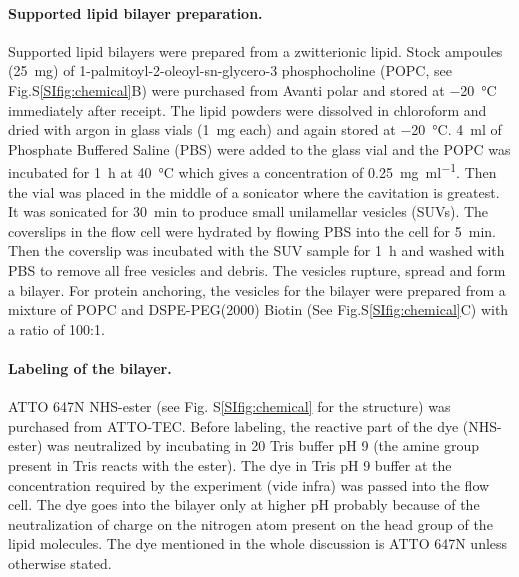 \paragraph*{Supported lipid bilayer preparation.}
Supported lipid bilayers were prepared from a zwitterionic lipid.
Stock ampoules (\SI{25}{\mg}) of 1-palmitoyl-2-oleoyl-sn-glycero-3 phosphocholine (POPC, see Fig.S\ref{SIfig:chemical}B) were purchased from Avanti polar and stored at \SI{-20}{\celsius} immediately after receipt.
The lipid powders were dissolved in chloroform and dried with argon in glass vials (\SI{1}{\mg} each) and again stored at \SI{-20}{\celsius}.
\SI{4}{\ml} of Phosphate Buffered Saline (PBS) were added to the glass vial and the POPC was incubated for \SI{1}{\hour} at \SI{40}{\celsius} which gives a concentration of \SI[per-mode=symbol]{0.25}{\mg \per\ml}.
Then the vial was placed in the middle of a sonicator where the cavitation is greatest.
It was sonicated for \SI{30}{\minute} to produce small unilamellar vesicles (SUVs). 
The coverslips in the flow cell were hydrated by flowing PBS into the cell for \SI{5}{\minute}.
Then the coverslip was incubated with the SUV sample for \SI{1}{\hour} and washed with PBS to remove all free vesicles and debris.
The vesicles rupture, spread and form a bilayer.\cite{richter2006formation}
For protein anchoring, the vesicles for the bilayer were prepared from a mixture of POPC and DSPE-PEG(2000) Biotin (See Fig.S\ref{SIfig:chemical}C) with a ratio of 100:1.


\paragraph*{Labeling of the bilayer.}
ATTO 647N NHS-ester (see Fig. S\ref{SIfig:chemical} for the structure) was purchased from ATTO-TEC.
Before labeling, the reactive part of the dye (NHS-ester) was neutralized by incubating in \SI{20}{\mM} Tris buffer pH 9 (the amine group present in Tris reacts with the ester).
The dye in Tris pH 9 buffer at the concentration required by the experiment (vide infra) was passed into the flow cell.
The dye goes into the bilayer only at higher pH probably because of the neutralization of charge on the nitrogen atom present on the head group of the lipid molecules. 
The dye mentioned in the whole discussion is ATTO 647N unless otherwise stated.


